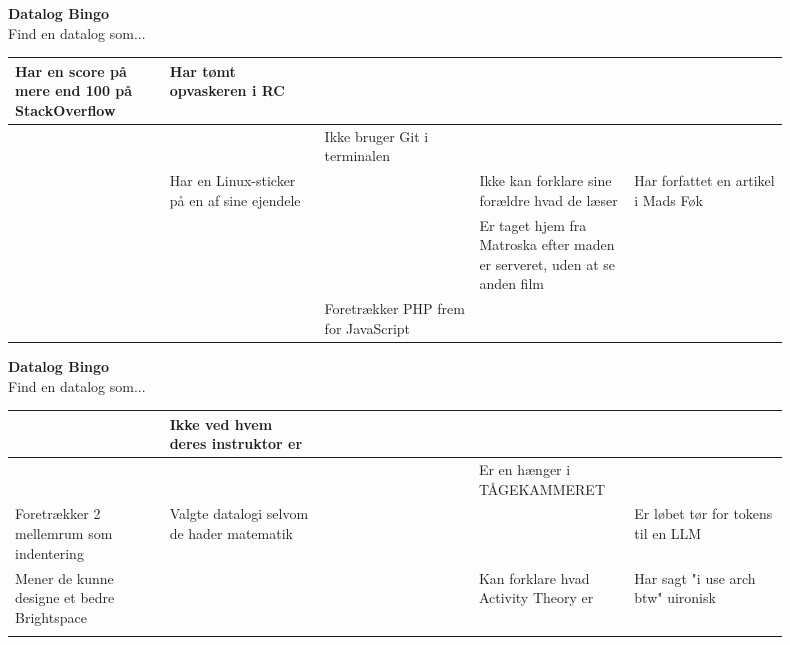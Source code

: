 \documentclass{article}
\begin{document}
\begin{center}
{\LARGE\bfseries Datalog Bingo}\\[0.5em]
{\large Find en datalog som...}\\[2em]
\begin{tabular}{|p{0.18\linewidth}|p{0.18\linewidth}|p{0.18\linewidth}|p{0.18\linewidth}|p{0.18\linewidth}|}
\hline
Har en score på mere end 100 på StackOverflow & Har tømt opvaskeren i RC &   &   &   \\
\hline
  &   & Ikke bruger Git i terminalen &   &   \\
\hline
  & Har en Linux-sticker på en af sine ejendele &   & Ikke kan forklare sine forældre hvad de læser & Har forfattet en artikel i Mads Føk \\
\hline
  &   &   & Er taget hjem fra Matroska efter maden er serveret, uden at se anden film &   \\
\hline
  &   & Foretrækker PHP frem for JavaScript &   &   \\
\hline
\end{tabular}
\end{center}
\newpage

\begin{center}
{\LARGE\bfseries Datalog Bingo}\\[0.5em]
{\large Find en datalog som...}\\[2em]
\begin{tabular}{|p{0.18\linewidth}|p{0.18\linewidth}|p{0.18\linewidth}|p{0.18\linewidth}|p{0.18\linewidth}|}
\hline
  & Ikke ved hvem deres instruktor er &   &   &   \\
\hline
  &   &   & Er en hænger i TÅGEKAMMERET &   \\
\hline
Foretrækker 2 mellemrum som indentering & Valgte datalogi selvom de hader matematik &   &   & Er løbet tør for tokens til en LLM \\
\hline
Mener de kunne designe et bedre Brightspace &   &   & Kan forklare hvad Activity Theory er & Har sagt "i use arch btw" uironisk \\
\hline
  &   &   &   &   \\
\hline
\end{tabular}
\end{center}
\newpage
\end{document}
